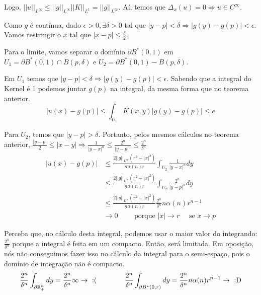 \documentclass[11pt]{article}
\newcommand{\p}{\partial}
\newcommand{\e}{\epsilon}
\newcommand{\norm}[2]{\left|\left|#1\right|\right|_{L^{#2}}}
\begin{document}
Logo, \( \norm{u}{\infty}  \leq \norm{g}{\infty} \norm{K}{1} = \norm{g}{\infty}\). Aí, temos que \( \Delta_x (u)=0  \Rightarrow u \in C^\infty\).

Como \(g\) é contínua, dado \(\e > 0, \exists \delta >0 \) tal que \( |y-p| < \delta \Rightarrow |g(y) - g(p)| < \e\). Vamos restringir o \(x\) tal que \(|x-p| \leq \frac{\delta}{2}\).

Para o limite, vamos separar o domínio \(\p B^*(0,1)\) em \( U_1 = \p B^*(0,1) \cap B(p,\delta) \) e \(U_2 = \p B^*(0,1) - B(p,\delta)\).

Em \(U_1\) temos que \(|y-p| < \delta \Rightarrow |g(y) - g(p)|< \e\). Sabendo que a integral do Kernel é 1 podemos juntar \(g(p)\) na integral, da mesma forma que no teorema anterior. \[|u(x) - g(p)| \leq \int_{U_1} K(x,y) |g(y) - g(p)| \leq e \]

Para \(U_2\), temos que \(|y-p|>\delta \).  Portanto, pelos mesmos cálculos no teorema anterior, \( \frac{|y-p|}{2} \leq |x-y| \Rightarrow \frac{1}{|y-x|^n} \leq \frac{2^n}{|y-p|^n} \leq \frac{2^n}{\delta^n} \)
 \begin{align*}
	|u(x) - g(p)| &\leq \frac{2\norm{g}{\infty} (r^2 - |x|^2)}{n \alpha(n) r} \int_{U_2} \frac{1}{|y-x|^n} dy\\
	&\leq \frac{2\norm{g}{\infty} (r^2 - |x|^2)}{n \alpha(n) r} \int_{U_2} \frac{2^n}{|y-p|^n} dy\\
	&\leq \frac{2\norm{g}{\infty} (r^2 - |x|^2)}{n \alpha(n) r} \frac{2^n}{\delta^n} n\alpha(n) r^{n-1}\\
	&\rightarrow 0 \qquad\text{ porque } |x| \rightarrow r \quad \text{ se } x \rightarrow p 
\end{align*}

Perceba que, no cálculo desta integral, podemos usar o maior valor do integrando: \(\frac{2^n}{\delta^n}\) porque a integral é feita em um compacto. Então, será limitada. Em oposição, nós não conseguimos fazer isso no cálculo da integral para o semi-espaço, pois o domínio de integração não é compacto.
\[\frac{2^n}{\delta^n}\int_{\p\seR} dy = \frac{2^n}{\delta^n} \infty \rightarrow  \ \text{:(} \qquad\qquad
\frac{2^n}{\delta^n}\int_{\p B^*(0,r)} dy = \frac{2^n}{\delta^n} n \alpha(n) r^{n-1} \rightarrow  \ \text{:D} \]
\end{document}
